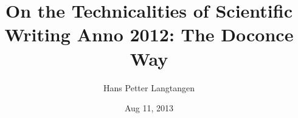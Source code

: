 \documentclass{beamer}
\begin{document}







\title{On the Technicalities of Scientific Writing Anno 2012: The Doconce Way}

\author{Hans Petter Langtangen}


\date{Aug 11, 2013
}

\begin{frame}
\titlepage
\end{frame}
\end{document}

